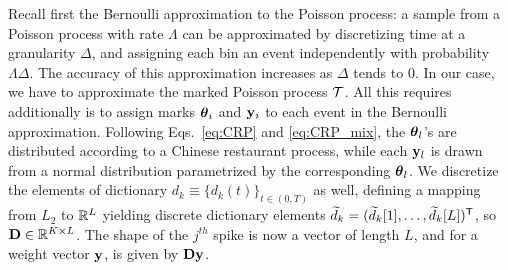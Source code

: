 Recall first the Bernoulli approximation to the Poisson process: a sample from a Poisson process with rate $\Lambda$ can be approximated by discretizing
time at a granularity $\Delta$, and assigning each bin an event independently with probability $\Lambda\Delta$. The accuracy of this approximation increases 
as $\Delta$ tends to $0$.
%
In our case, we have to approximate the marked Poisson process $\mathcal{T}$. All this requires additionally is to assign marks $\boldsymbol{\theta}_i$ and $\mathbf{y}_i$ to each event 
in the Bernoulli approximation. Following Eqs.~\eqref{eq:CRP} and \eqref{eq:CRP_mix}, the $\boldsymbol{\theta}_l$'s are distributed according
to a Chinese restaurant process, while each $\mathbf{y}_l$ is drawn from a normal distribution parametrized by the corresponding $\boldsymbol{\theta}_l$. We discretize the 
elements of dictionary $d_k \equiv \{d_k(t)\}_{t \in (0,T)}$ as well, defining a mapping from $L_2$ to $\mathbb{R}^L$ yielding discrete dictionary elements $\widetilde{d}_k=(\widetilde{d}_k[1], \ldots, \widetilde{d}_k[L])^{\mathsf{T}}$,  so  $\mathbf{D} \in \mathbb{R}^{K \times L}$. The shape of the $j^{th}$ spike is now a vector of length $L$, and for a weight vector
$\mathbf{y}$, is given by $\mathbf{D} \mathbf{y}$.


